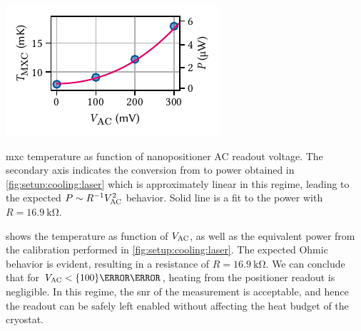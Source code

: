 \begin{marginfigure}[*-8]
    \centering
    \includegraphics{img/pdf/setup/anc_readout_heating}
    \caption[]{
        \Acrlong{mxc} temperature as function of nanopositioner AC readout voltage.
        The secondary axis indicates the conversion from \Tmxc to power obtained in \cref{fig:setup:cooling:laser} which is approximately linear in this regime, leading to the expected $P\sim R^{-1} V_{\mathrm{AC}}^2$ behavior.
        Solid line is a fit to the power with $R=\qty{16.9}{\kilo\ohm}$.
    }
    \label{fig:setup:cooling:anc}
\end{marginfigure}

 shows the temperature as function of $V_{\mathrm{AC}}$, as well as the equivalent power from the calibration performed in \cref{fig:setup:cooling:laser}.
The expected Ohmic behavior is evident, resulting in a resistance of $R=\qty{16.9}{\kilo\ohm}$.
We can conclude that for $V_{\mr{AC}} < \qty{100}{\milli\volt}$, heating from the positioner readout is negligible.
In this regime, the \gls{snr} of the measurement is acceptable, and hence the readout can be safely left enabled without affecting the heat budget of the cryostat.

